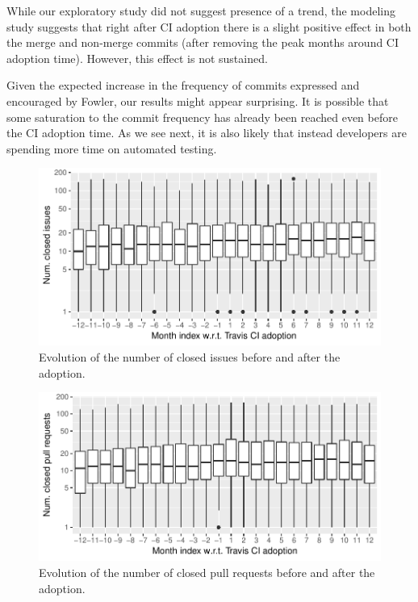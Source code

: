While our exploratory study did not suggest presence of a trend, the 
modeling study suggests that right after CI adoption there is a slight 
positive effect in both the merge and non-merge commits (after removing the peak months around CI adoption time). 
However, this effect is not sustained.

Given the expected increase in the frequency of commits expressed and 
encouraged by Fowler, our results might appear surprising.
It is possible that some saturation to the commit frequency has already 
been reached even before the CI adoption time.
As we see next, it is also likely that instead developers are spending more time on 
automated testing.



\begin{figure}[t]
\centering
\includegraphics[width=\columnwidth, clip=true, trim=0 0 0 0]{figures/issues.pdf}
\caption{Evolution of the number of closed issues before and after the \Tvis adoption.}
\label{fig:issues}
\end{figure}

\begin{figure}[t]
\centering
\includegraphics[width=\columnwidth, clip=true, trim=0 0 0 0]{figures/prs-full.pdf}
\caption{Evolution of the number of closed pull requests before and after the \Tvis adoption.}
\label{fig:prs}
\end{figure}


